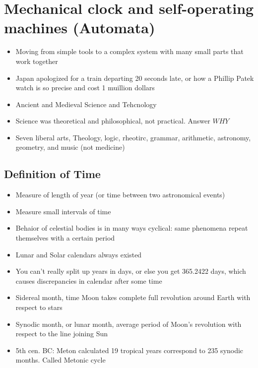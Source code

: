 \documentclass{article}
\begin{document}
\section{Mechanical clock and self-operating machines (Automata)}
\begin{itemize}
  \item Moving from simple tools to a complex system
    with many small parts that work together
  \item Japan apologized for a train departing 20 seconds late,
    or how a Phillip Patek watch is so precise and cost 1 muillion dollars
  \item Ancient and Medieval Science and Tehcnology
  \item Science was theoretical and philosophical, not practical. Answer $WHY$
  \item Seven liberal arts, Theology, logic, rheotirc, grammar, arithmetic, astronomy, geometry, and music (not medicine)
\end{itemize}

\subsection{Definition of Time}
\begin{itemize}
  \item Measure of length of year (or time between two astronomical events)
  \item Measure small intervals of time
  \item Behaior of celestial bodies is in many ways cyclical: same phenomena repeat themselves with a certain period
  \item Lunar and Solar calendars always existed
  \item You can't really split up years in days, or else you get
    365.2422 days, which causes discrepancies in calendar after some time
  \item Sidereal month, time Moon takes complete full revolution around Earth with respect to stars
  \item Synodic month, or lunar month, average period of Moon's revolution with respect
    to the line joining Sun
  \item 5th cen. BC: Meton calculated 19 tropical years correspond to
    235 synodic months. Called Metonic cycle
\end{itemize}
\end{document}
